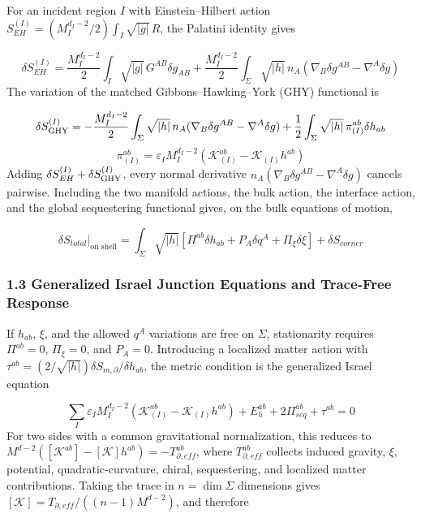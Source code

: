 \documentclass[aps,prd,onecolumn,superscriptaddress,nofootinbib,longbibliography,10pt]{revtex4-2}
\begin{document}
{{  For an incident region \(I\) with Einstein–Hilbert action \(S_{EH}^{(I)} = (M_I^{d_I - 2}/2)\int_I \sqrt{|g|}\, R\), the Palatini identity gives


  \[ \delta S_{EH}^{(I)} = \frac{M_I^{d_I - 2}}{2}\int_I \sqrt{|g|}\, G^{AB}\delta g_{AB} + \frac{M_I^{d_I - 2}}{2}\int_\Sigma \sqrt{|h|}\, n_A(\nabla_B \delta g^{AB} - \nabla^A \delta g) \]
  The variation of the matched Gibbons–Hawking–York (GHY) functional is


  \[ \delta S_{{\small \mathrm{GHY}}}^{{\small (I)}} = -\frac{M_I^{d_I - 2}}{2}\int_\Sigma \sqrt{|h|}\, n_A(\nabla_B \delta g^{AB} - \nabla^A \delta g) + \frac{1}{2}\int_\Sigma \sqrt{|h|}\, \pi_{(I)}^{ab}\delta h_{ab} \]
  \[ \pi_{(I)}^{ab} = \varepsilon_I M_I^{d_I - 2}(\mathcal{K}_{(I)}^{ab} - \mathcal{K}_{(I)}h^{ab}) \]
  Adding \(\delta S_{EH}^{(I)} + \delta S_{{\small \mathrm{GHY}}}^{{\small (I)}}\), every normal derivative \(n_A(\nabla_B \delta g^{AB} - \nabla^A \delta g)\) cancels pairwise. Including the two manifold actions, the bulk action, the interface action, and the global sequestering functional gives, on the bulk equations of motion,


  \[ \delta S_{total}|_{\text{on shell}} = \int_\Sigma \sqrt{|h|} \left[ \Pi^{ab}\delta h_{ab} + P_A \delta q^A + \Pi_\xi \delta\xi \right] + \delta S_{corner} \]

  
\subsubsection*{1.3 Generalized Israel Junction Equations and Trace-Free Response}

  If \(h_{ab}\), \(\xi\), and the allowed \(q^A\) variations are free on \(\Sigma\), stationarity requires \(\Pi^{ab} = 0\), \(\Pi_\xi = 0\), and \(P_A = 0\). Introducing a localized matter action with \(\tau^{ab} = (2/\sqrt{|h|})\delta S_{m,\partial}/\delta h_{ab}\), the metric condition is the generalized Israel equation


  \[ \sum_I \varepsilon_I M_I^{d_I - 2}(\mathcal{K}_{(I)}^{ab} - \mathcal{K}_{(I)}h^{ab}) + E_h^{ab} + 2\Pi_{seq}^{ab} + \tau^{ab} = 0 \]
  For two sides with a common gravitational normalization, this reduces to \(M^{d-2}([\mathcal{K}^{ab}] - [\mathcal{K}]h^{ab}) = -T^{ab}_{\partial,eff}\), where \(T^{ab}_{\partial,eff}\) collects induced gravity, \(\xi\), potential, quadratic-curvature, chiral, sequestering, and localized matter contributions. Taking the trace in \(n = \dim\Sigma\) dimensions gives \([\mathcal{K}] = T_{\partial,eff}/((n-1)M^{d-2})\), and therefore


}}
\end{document}
